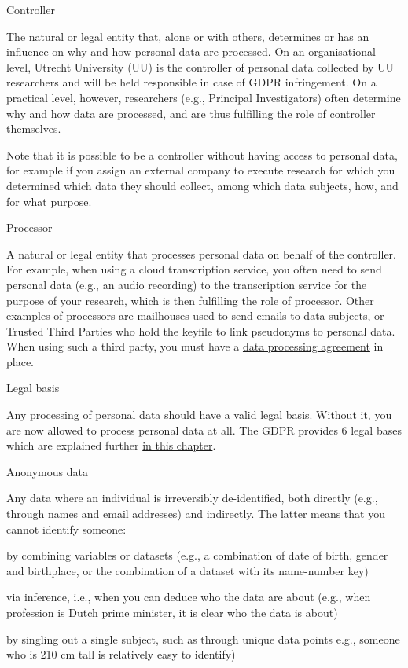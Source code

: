 \documentclass[
]{book}
\begin{document}
Controller

The natural or legal entity that, alone or with others, determines or has an
influence on why and how personal data are processed. On an
organisational level, Utrecht University (UU) is the controller of personal
data collected by UU researchers and will be held responsible in case of GDPR
infringement. On a practical level, however, researchers (e.g., Principal
Investigators) often determine why and how data are processed, and are thus
fulfilling the role of controller themselves.

Note that it is possible to be a controller without having access to personal
data, for example if you assign an external company to execute research for
which you determined which data they should collect, among which data subjects,
how, and for what purpose.

Processor

A natural or legal entity that processes personal data on behalf of the
controller. For example, when using a cloud transcription service, you often
need to send personal data (e.g., an audio recording) to the transcription
service for the purpose of your research, which is then fulfilling the role
of processor. Other examples of processors are mailhouses used to send emails
to data subjects, or Trusted Third Parties who hold the keyfile to link
pseudonyms to personal data. When using such a third party, you must have a
\protect\hyperlink{data-processing-agreement}{data processing agreement} in place.

Legal basis

Any processing of personal data should have a valid legal basis. Without it,
you are now allowed to process personal data at all. The GDPR provides 6 legal
bases which are explained further \protect\hyperlink{legal-basis}{in this chapter}.

Anonymous data

Any data where an individual is irreversibly de-identified, both directly
(e.g., through names and email addresses) and indirectly. The latter means
that you cannot identify someone:

by combining variables or datasets (e.g., a combination of date of birth,
gender and birthplace, or the combination of a dataset with its name-number key)

via inference, i.e., when you can deduce who the data are about (e.g.,
when profession is Dutch prime minister, it is clear who the data is about)

by singling out a single subject, such as through unique data points
e.g., someone who is 210 cm tall is relatively easy to identify)
\end{document}
